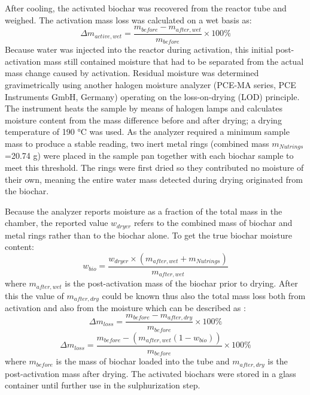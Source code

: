 \begin{enumerate}
    After cooling, the activated biochar was recovered from the reactor tube and weighed. The activation mass loss was calculated on a wet basis as:
    \begin{equation}
        \Delta m_{active,wet}=\frac{m_{before}-m_{after,wet}}{m_{before}} \times 100\%
    \end{equation}
    Because water was injected into the reactor during activation, this initial post-activation mass still contained moisture that had to be separated from the actual mass change caused by activation. Residual moisture was determined gravimetrically using another halogen moisture analyzer (PCE-MA series, PCE Instruments GmbH, Germany) operating on the loss-on-drying (LOD) principle. The instrument heats the sample by means of halogen lamps and calculates moisture content from the mass difference before and after drying; a drying temperature of 190 °C was used. As the analyzer required a minimum sample mass to produce a stable reading, two inert metal rings (combined mass $m_{Nutrings}$=20.74 g) were placed in the sample pan together with each biochar sample to meet this threshold. The rings were first dried so they contributed no moisture of their own, meaning the entire water mass detected during drying originated from the biochar.
    
   Because the analyzer reports moisture as a fraction of the total mass in the chamber, the reported value $w_{dryer}$ refers to the combined mass of biochar and metal rings rather than to the biochar alone. To get the true biochar moisture content:
    \begin{equation}
        w_{bio}=\frac{w_{dryer}\times(m_{after,wet}+m_{Nutrings})}{m_{after,wet}}
    \end{equation}
where $m_{after,wet}$ is the post-activation mass of the biochar prior to drying. After this  the value of $m_{after,dry}$ could be known thus also the total mass loss both from activation and also from the moisture which can be described as :
\begin{equation}
    \Delta m_{loss}=\frac{m_{before}-m_{after,dry}}{m_{before}} \times 100\%
\end{equation}
    \begin{equation}
        \Delta m_{loss}=\frac{m_{before}-(m_{after,wet}(1-w_{bio}))}{m_{before}} \times 100\%
    \end{equation}
    where $m_{before}$ is the mass of biochar loaded into the tube and $m_{after,dry}$ is the post-activation mass after drying. The activated biochars were stored in a glass container until further use in the sulphurization step.
\end{enumerate}

